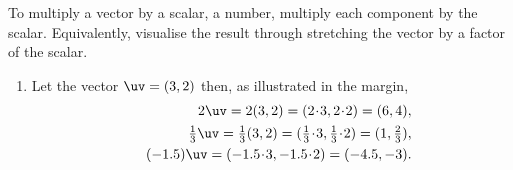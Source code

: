 \begin{example} \label{eg:}
To multiply a vector by a scalar, a number, multiply each component by the scalar. 
Equivalently, visualise the result through stretching the vector by a factor of the scalar.
\begin{enumerate}
\item Let the vector \(\uv=(3,2)\) then, as illustrated in the margin,
\begin{eqnarray*}&&
2\uv=2(3,2) =(2\cdot3,2\cdot2) =(6,4),
\\&&
\tfrac13\uv=\tfrac13(3,2) =(\tfrac13\cdot3,\tfrac13\cdot2) =(1,\tfrac23),
\\&&
(-1.5)\uv =(-1.5\cdot3,-1.5\cdot2) =(-4.5,-3).
\end{eqnarray*}


\end{enumerate}
\end{example}
